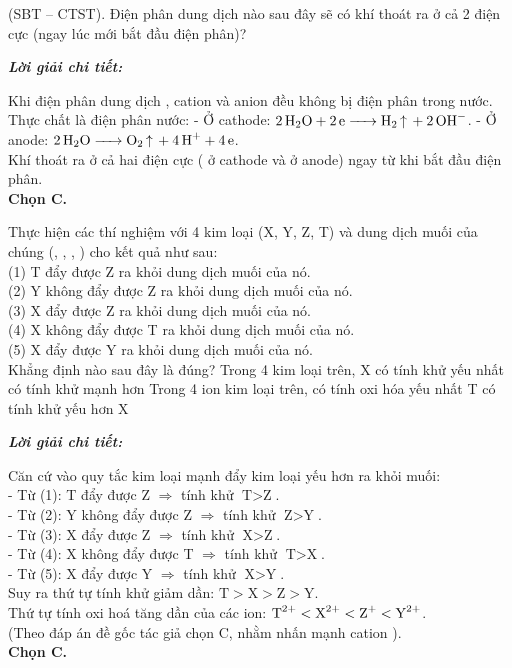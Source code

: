 \documentclass[11pt,a4paper]{article}
\def\loigiai#1{
\par\begingroup\color{blue!80!black}\small
\noindent\textbf{\textit{Lời giải chi tiết:}}\par
#1\par\endgroup}
\begin{document}
\begin{ex}
(SBT – CTST). Điện phân dung dịch nào sau đây sẽ có khí thoát ra ở cả 2 điện cực (ngay lúc mới bắt đầu điện phân)?
\choice
{}
{}
{\True {}}
{}
\loigiai{
Khi điện phân dung dịch \ce{K2SO4}, cation  và anion \ce{SO4^2-} đều không bị điện phân trong nước. Thực chất là điện phân nước:
- Ở cathode: $\ce{2H2O + 2e -> H2 ^ + 2OH-}$.
- Ở anode: $\ce{2H2O -> O2 ^ + 4H+ + 4e}$.\\
Khí thoát ra ở cả hai điện cực (\ce{H2} ở cathode và \ce{O2} ở anode) ngay từ khi bắt đầu điện phân.\\
\textbf{Chọn C.}}
\end{ex}

\begin{ex}
Thực hiện các thí nghiệm với 4 kim loại (X, Y, Z, T) và dung dịch muối của chúng (, , , ) cho kết quả như sau:\\
(1) T đẩy được Z ra khỏi dung dịch muối của nó.\\
(2) Y không đẩy được Z ra khỏi dung dịch muối của nó.\\
(3) X đẩy được Z ra khỏi dung dịch muối của nó.\\
(4) X không đẩy được T ra khỏi dung dịch muối của nó.\\
(5) X đẩy được Y ra khỏi dung dịch muối của nó.\\
Khẳng định nào sau đây là đúng?
\choice
{Trong 4 kim loại trên, X có tính khử yếu nhất}
{ có tính khử mạnh hơn }
{\True Trong 4 ion kim loại trên,  có tính oxi hóa yếu nhất}
{T có tính khử yếu hơn X}
\loigiai{
Căn cứ vào quy tắc kim loại mạnh đẩy kim loại yếu hơn ra khỏi muối:\\
- Từ (1): T đẩy được Z $\Rightarrow$ tính khử $\text{T} > \text{Z}$.\\
- Từ (2): Y không đẩy được Z $\Rightarrow$ tính khử $\text{Z} > \text{Y}$.\\
- Từ (3): X đẩy được Z $\Rightarrow$ tính khử $\text{X} > \text{Z}$.\\
- Từ (4): X không đẩy được T $\Rightarrow$ tính khử $\text{T} > \text{X}$.\\
- Từ (5): X đẩy được Y $\Rightarrow$ tính khử $\text{X} > \text{Y}$.\\
Suy ra thứ tự tính khử giảm dần: $\text{T} > \text{X} > \text{Z} > \text{Y}$.\\
Thứ tự tính oxi hoá tăng dần của các ion: $\ce{T^2+} < \ce{X^2+} < \ce{Z+} < \ce{Y^2+}$.\\
(Theo đáp án đề gốc tác giả chọn C, nhằm nhấn mạnh cation \ce{Y^2+}).\\
\textbf{Chọn C.}}
\end{ex}
\end{document}
